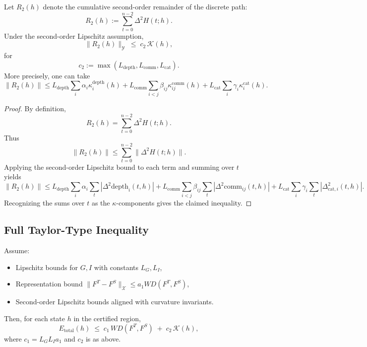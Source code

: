 \documentclass[11pt]{article}
\theoremstyle{definition}
\theoremstyle{plain}
\theoremstyle{remark}
\begin{document}
\begin{alem}
Let \(R_2(h)\) denote the cumulative second-order remainder of the discrete path:
\[
  R_2(h) := \sum_{t=0}^{n-2} \Delta^2 H(t;h).
\]
Under the second-order Lipschitz assumption,
\[
  \|R_2(h)\|_{\mathcal{Y}}
  \;\le\;
  c_2 \, \mathcal{K}(h),
\]
for
\[
  c_2 :=
  \max\left(
    L_{\text{depth}}, L_{\text{comm}}, L_{\text{cat}}
  \right).
\]
More precisely, one can take
\[
  \|R_2(h)\|
  \le
  L_{\text{depth}} \sum_i \alpha_i \kappa_i^{\text{depth}}(h)
  + L_{\text{comm}} \sum_{i<j} \beta_{ij} \kappa_{ij}^{\text{comm}}(h)
  + L_{\text{cat}} \sum_i \gamma_i \kappa_i^{\text{cat}}(h).
\]
\end{alem}

\begin{proof}
By definition,
\[
  R_2(h) = \sum_{t=0}^{n-2} \Delta^2 H(t;h).
\]
Thus
\[
  \|R_2(h)\| \le \sum_{t=0}^{n-2} \|\Delta^2 H(t;h)\|.
\]
Applying the second-order Lipschitz bound to each term and summing over \(t\) yields
\[
  \|R_2(h)\|
  \le
  L_{\text{depth}} \sum_i \alpha_i \sum_{t} |\Delta^2 \text{depth}_i(t,h)|
  + L_{\text{comm}} \sum_{i<j} \beta_{ij} \sum_t |\Delta^2 \text{comm}_{ij}(t,h)|
  + L_{\text{cat}} \sum_i \gamma_i \sum_t |\Delta^2_{\text{cat},i}(t,h)|.
\]
Recognizing the sums over \(t\) as the \(\kappa\)-components gives the claimed inequality.
\end{proof}

\subsection{Full Taylor-Type Inequality}

\begin{athm}
Assume:
\begin{itemize}[leftmargin=2em]
  \item Lipschitz bounds for \(G,I\) with constants \(L_G,L_I\),
  \item Representation bound \(\|F^T-F^S\|_{\mathcal{X}} \le a_1 WD(F^T,F^S)\),
  \item Second-order Lipschitz bounds aligned with curvature invariants.
\end{itemize}
Then, for each state \(h\) in the certified region,
\[
  E_{\text{total}}(h)
  \;\le\;
  c_1 \, WD(F^T,F^S)
  \;+\;
  c_2 \,\mathcal{K}(h),
\]
where \(c_1 = L_G L_I a_1\) and \(c_2\) is as above.
\end{athm}
\end{document}
